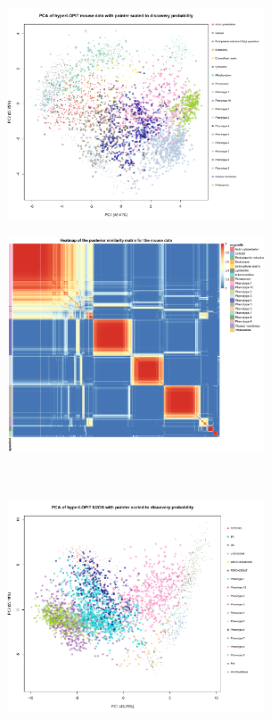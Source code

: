 \documentclass[12pt,english]{article}
\begin{document}
\begin{figure}[ht]
	\begin{subfigure}[t]{0.5\textwidth}
		\centering
		\includegraphics[height=2.5in]{pcaMousehl.pdf}
		\caption{}
	\end{subfigure}
	\begin{subfigure}[t]{0.5\textwidth}
		\centering
		\includegraphics[height=2.5in]{heatmapMousehl.pdf}
		\caption{}
	\end{subfigure}
~
	\begin{subfigure}[t]{0.5\textwidth}
	\centering
	\includegraphics[height=2.5in]{pcau2oshl.pdf}
	\caption{}
\end{subfigure}
\begin{subfigure}[t]{0.5\textwidth}

\end{subfigure}
\end{figure}
\end{document}
